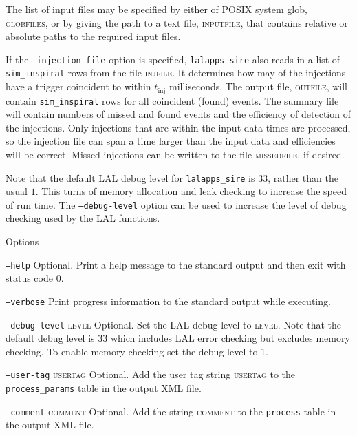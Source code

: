 \begin{entry}
The list of input files may be specified by either of POSIX system glob,
\textsc{globfiles}, or by giving the path to a text file, \textsc{inputfile},
that contains relative or absolute paths to the required input files.

If the \texttt{--injection-file} option is specified, \verb$lalapps_sire$ also
reads in a list of \verb$sim_inspiral$ rows from the file \textsc{injfile}.
It determines how may of the injections have a trigger coincident to within
$t_\mathrm{inj}$ milliseconds. The output file, \textsc{outfile}, will contain
\verb$sim_inspiral$ rows for all coincident (found) events. The summary file
will contain numbers of missed and found events and the efficiency of
detection of the injections.  Only injections that are within the input data
times are processed, so the injection file can span a time larger than the
input data and efficiencies will be correct. Missed injections can be written
to the file \textsc{missedfile}, if desired.

Note that the default LAL debug level for \verb$lalapps_sire$ is $33$, rather
than the usual $1$. This turns of memory allocation and leak checking to
increase the speed of run time. The \texttt{--debug-level} option can be used
to increase the level of debug checking used by the LAL functions.

\item[Options]\leavevmode
\begin{entry}
\item[\texttt{--help}] Optional. Print a help message to the standard output
and then exit with status code $0$.

\item[\texttt{--verbose}] Print progress information to the standard output 
while executing.

\item[\texttt{--debug-level} \textsc{level}] Optional. Set the LAL debug level
to \textsc{level}. Note that the default debug level is $33$ which includes
LAL error checking but excludes memory checking.  To enable memory checking
set the debug level to 1.

\item[\texttt{--user-tag} \textsc{usertag}] Optional. Add the user tag string 
\textsc{usertag} to the \verb$process_params$ table in the output XML file.

\item[\texttt{--comment} \textsc{comment}] Optional. Add the string
\textsc{comment} to the \verb$process$ table in the output XML file.


\end{entry}
\end{entry}
